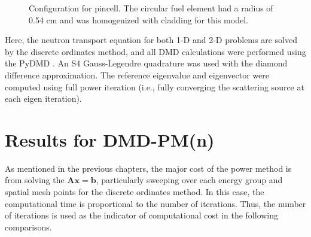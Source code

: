 \begin{figure}[htb]
    \centering
    \caption{Configuration for pincell.  The circular fuel element had a 
             radius of 0.54 cm and was homogenized with cladding for this 
             model.}
    \label{fig:pin_cell_config}
\end{figure}
Here, the neutron transport equation for both 1-D and 2-D problems are solved by the discrete ordinates method, and all DMD calculations were performed using the PyDMD \cite{pydmd}.
An S4 Gauss-Legendre quadrature was used with the diamond difference approximation.
The reference eigenvalue and eigenvector were computed using full power iteration (i.e., fully converging the scattering source at each eigen iteration).

\section{Results for DMD-PM(n)}
As mentioned in the previous chapters, the major cost of the power method is from solving the $\mathbf{Ax =b}$, particularly sweeping over each energy group and spatial mesh points for the discrete ordinates method.
In this case, the computational time is proportional to the number of iterations.
Thus, the number of iterations is used as the indicator of computational cost in the following comparisons.

